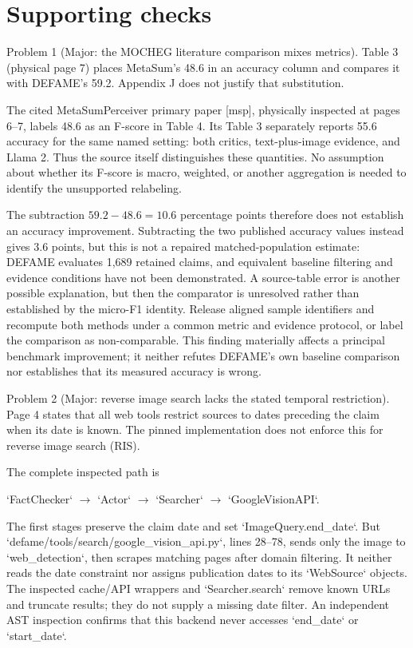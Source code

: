 \documentclass[10pt]{article}
\begin{document}
\section*{Supporting checks}
Problem 1 (Major: the MOCHEG literature comparison mixes metrics).  Table 3 (physical page 7) places MetaSum’s 48.6 in an accuracy column and compares it with DEFAME’s 59.2. Appendix J does not justify that substitution.\par
The cited MetaSumPerceiver primary paper [msp], physically inspected at pages 6–7, labels 48.6 as an F-score in Table 4. Its Table 3 separately reports 55.6 accuracy for the same named setting: both critics, text-plus-image evidence, and Llama 2. Thus the source itself distinguishes these quantities. No assumption about whether its F-score is macro, weighted, or another aggregation is needed to identify the unsupported relabeling.\par
The subtraction \(59.2-48.6=10.6\) percentage points therefore does not establish an accuracy improvement. Subtracting the two published accuracy values instead gives \(3.6\) points, but this is not a repaired matched-population estimate: DEFAME evaluates 1,689 retained claims, and equivalent baseline filtering and evidence conditions have not been demonstrated. A source-table error is another possible explanation, but then the comparator is unresolved rather than established by the micro-F1 identity. Release aligned sample identifiers and recompute both methods under a common metric and evidence protocol, or label the comparison as non-comparable. This finding materially affects a principal benchmark improvement; it neither refutes DEFAME’s own baseline comparison nor establishes that its measured accuracy is wrong.\par
Problem 2 (Major: reverse image search lacks the stated temporal restriction).  Page 4 states that all web tools restrict sources to dates preceding the claim when its date is known. The pinned implementation does not enforce this for reverse image search (RIS).\par
The complete inspected path is\par
`FactChecker` \(\to\) `Actor` \(\to\) `Searcher` \(\to\) `GoogleVisionAPI`.\par
The first stages preserve the claim date and set `ImageQuery.end\_date`. But `defame/tools/search/google\_vision\_api.py`, lines 28–78, sends only the image to `web\_detection`, then scrapes matching pages after domain filtering. It neither reads the date constraint nor assigns publication dates to its `WebSource` objects. The inspected cache/API wrappers and `Searcher.search` remove known URLs and truncate results; they do not supply a missing date filter. An independent AST inspection confirms that this backend never accesses `end\_date` or `start\_date`.\par
\end{document}
